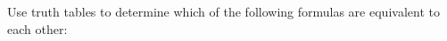     \question  Use truth tables to determine which of the following formulas are equivalent to each other:
    

